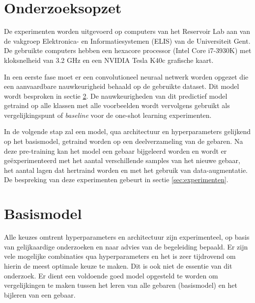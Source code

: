 \section{Onderzoeksopzet}

De experimenten worden uitgevoerd op computers van het Reservoir Lab aan van de vakgroep Elektronica- en Informatiesystemen (ELIS) van de Universiteit Gent. De gebruikte computers hebben een hexacore processor (Intel Core i7-3930K) met kloksnelheid van 3.2 GHz en een NVIDIA Tesla K40c grafische kaart.

\npar In een eerste fase moet er een convolutioneel neuraal netwerk worden opgezet die een aanvaardbare nauwkeurigheid behaald op de gebruikte dataset. Dit model wordt besproken in sectie \ref{sec:basismodel}. De nauwkeurigheden van dit predictief model getraind op alle klassen met alle voorbeelden wordt vervolgens gebruikt als vergelijkingspunt of \textit{baseline} voor de one-shot learning experimenten.

\npar In de volgende stap zal een model, qua architectuur en hyperparameters gelijkend op het basismodel, getraind worden op een deelverzameling van de gebaren. Na deze pre-training kan het model een gebaar bijgeleerd worden en wordt er ge\"experimenteerd met het aantal verschillende samples van het nieuwe gebaar, het aantal lagen dat hertraind worden en met het gebruik van data-augmentatie. De bespreking van deze experimenten gebeurt in sectie \ref{sec:experimenten}.

\section{Basismodel}\label{sec:basismodel}
Alle keuzes omtrent hyperparameters en architectuur zijn experimenteel, op basis van gelijkaardige onderzoeken en naar advies van de begeleiding bepaald. Er zijn vele mogelijke combinaties qua hyperparameters en het is zeer tijdrovend om hierin de meest optimale keuze te maken. Dit is ook niet de essentie van dit onderzoek. Er dient een voldoende goed model opgesteld te worden om vergelijkingen te maken tussen het leren van alle gebaren (basismodel) en het bijleren van een gebaar. 
